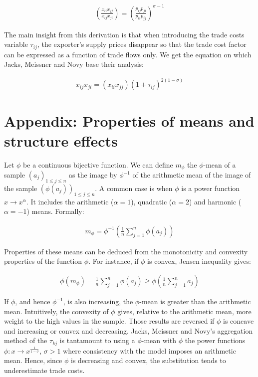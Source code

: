 \documentclass{article}
\begin{document}
\begin{eqnarray*}
\left(\frac{x_{ii} x_{jj}}{x_{ij} x_{ji}}\right)=\left(\frac{p_{ij}
p_{ji}}{p_{ii} p_{jj}}\right)^{\sigma-1}
\end{eqnarray*}

The main insight from this derivation is that when introducing
the trade costs variable $\tau_{ij}$, the exporter's supply
prices disappear so that the trade cost factor can be expressed
as a function of trade flows only. We get the equation on which
Jacks, Meissner and Novy base their analysis:

\begin{eqnarray*}
x_{ij} x_{ji} =(x_{ii} x_{jj}) (1+\tau_{ij})^{2(1-\sigma)}
\end{eqnarray*}

\section{\label{A2}Appendix: Properties of means and structure effects}


Let $\phi$ be a continuous bijective function. We can define
$m_{\phi}$ the $\phi$-mean of a sample $(a_j)_{1\leq j\leq n}$
as the image by $\phi^{-1}$ of the arithmetic mean of the image
of the sample $(\phi(a_j))_{1\leq j\leq n}$. A common case is
when $\phi$ is a power function $x \rightarrow x^\alpha$. It
includes the arithmetic ($\alpha=1$), quadratic ($\alpha=2$)
and harmonic ($\alpha=-1$) means. Formally:

\begin{eqnarray*}
m_{\phi}=\phi^{-1}\left(\frac{1}{n}\sum_{j=1}^n \phi(a_j)\right)
\end{eqnarray*}

Properties of these means can be deduced from the monotonicity
and convexity properties of the function $\phi$. For instance,
if $\phi$ is convex, Jensen inequality gives:

\begin{eqnarray*}
\phi(m_{\phi})=\frac{1}{n}\sum_{j=1}^n\phi(a_j)\geq \phi\left(\frac{1}{n}\sum_{j=1}^n
a_j\right)
\end{eqnarray*}

If $\phi$, and hence $\phi^{-1}$, is also increasing, the
$\phi$-mean is greater than the arithmetic mean. Intuitively,
the convexity of $\phi$ gives, relative to the arithmetic mean,
more weight to the high values in the sample. Those results are
reversed if $\phi$ is concave and increasing or convex and
decreasing. Jacks, Meissner and Novy's aggregation method of
the $\tau_{kj}$ is tantamount to using a $\phi$-mean with
$\phi$ the power functions $\phi: x \rightarrow
x^{\frac{1}{1-\sigma}}$, $\sigma>1$ where consistency with the
model imposes an arithmetic mean. Hence, since $\phi$ is
decreasing and convex, the substitution tends to underestimate trade costs.\\
\end{document}
